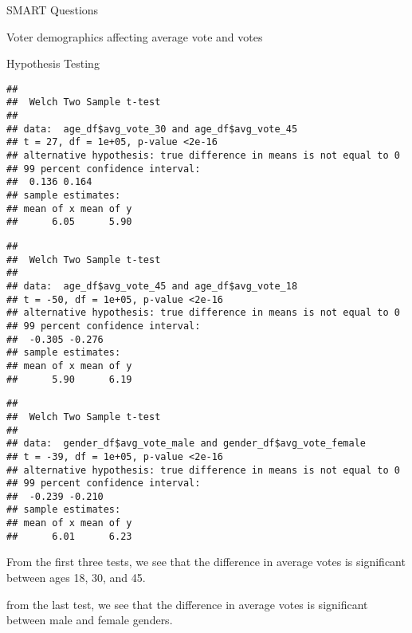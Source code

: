 \documentclass[
  ignorenonframetext,
]{beamer}
\newenvironment{Shaded}{\begin{snugshade}}{\end{snugshade}}
\newcommand{\AttributeTok}[1]{\textcolor[rgb]{0.77,0.63,0.00}{#1}}
\newcommand{\FloatTok}[1]{\textcolor[rgb]{0.00,0.00,0.81}{#1}}
\newcommand{\FunctionTok}[1]{\textcolor[rgb]{0.00,0.00,0.00}{#1}}
\newcommand{\NormalTok}[1]{#1}
\newcommand{\OtherTok}[1]{\textcolor[rgb]{0.56,0.35,0.01}{#1}}
\newcommand{\SpecialCharTok}[1]{\textcolor[rgb]{0.00,0.00,0.00}{#1}}
\begin{document}
\begin{frame}[fragile]{SMART Questions}
\begin{block}{Voter demographics affecting average vote and votes}
\begin{block}{Hypothesis Testing}
\begin{verbatim}
## 
##  Welch Two Sample t-test
## 
## data:  age_df$avg_vote_30 and age_df$avg_vote_45
## t = 27, df = 1e+05, p-value <2e-16
## alternative hypothesis: true difference in means is not equal to 0
## 99 percent confidence interval:
##  0.136 0.164
## sample estimates:
## mean of x mean of y 
##      6.05      5.90
\end{verbatim}

\begin{Shaded}
\end{Shaded}

\begin{verbatim}
## 
##  Welch Two Sample t-test
## 
## data:  age_df$avg_vote_45 and age_df$avg_vote_18
## t = -50, df = 1e+05, p-value <2e-16
## alternative hypothesis: true difference in means is not equal to 0
## 99 percent confidence interval:
##  -0.305 -0.276
## sample estimates:
## mean of x mean of y 
##      5.90      6.19
\end{verbatim}

\begin{Shaded}
\end{Shaded}

\begin{verbatim}
## 
##  Welch Two Sample t-test
## 
## data:  gender_df$avg_vote_male and gender_df$avg_vote_female
## t = -39, df = 1e+05, p-value <2e-16
## alternative hypothesis: true difference in means is not equal to 0
## 99 percent confidence interval:
##  -0.239 -0.210
## sample estimates:
## mean of x mean of y 
##      6.01      6.23
\end{verbatim}

From the first three tests, we see that the difference in average votes
is significant between ages 18, 30, and 45.

from the last test, we see that the difference in average votes is
significant between male and female genders.
\end{block}
\end{block}
\end{frame}
\end{document}
